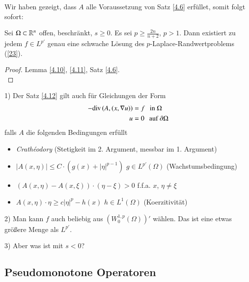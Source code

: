 Wir haben gezeigt, dass $A$ alle Voraussetzung von Satz \ref{4.6} erfüllet, somit folgt sofort:

\begin{theorem}\label{4.12}
    Sei $\Omega\subset\mathbb{R}^n$ offen, beschränkt, $s\geq 0$. Es sei $p\geq  \frac{2n}{n+2}$, $p>1$. Dann
    existiert zu jedem $f\in L^{p'}$ genau eine schwache Lösung des $p$-Laplace-Randwertproblems
    (\ref{23}).
\end{theorem}

\begin{proof}
    Lemma \ref{4.10}, \ref{4.11}, Satz \ref{4.6}.
    \[ \]
\end{proof}

\begin{remark}
    \begin{description}
        \item{1)}
        Der Satz \ref{4.12} gilt auch für Gleichungen der Form
        \begin{align*}
            -\mathrm{div}\,(A,(x,\nabla u))&=f \hspace{.25cm} \text{in } \Omega\\
                        u&=0 \hspace{.25cm} \text{auf }\partial\Omega
        \end{align*}
        falls $A$ die folgenden Bedingungen erfüllt
        \begin{itemize}
            \item \textit{Crathéodory} (Stetigkeit im 2. Argument, messbar im 1. Argument)
            \item  $|A(x,\eta)|\leq C\cdot (g(x)+ |\eta|^{p-1})$ $g\in L^{p'}(\Omega)$
                (Wachstumsbedingung)
            \item $(A(x,\eta)- A(x,\xi))\cdot (\eta-\xi)>0$ f.f.a. $x$, $\eta\neq \xi$
            \item $A(x,\eta)\cdot\eta\geq c|\eta|^p-h(x)$ $h\in L^1(\Omega)$ (Koerzitivität)
        \end{itemize}
        \item{2)}
        Man kann $f$ auch beliebig aus $(W_0^{1,p}(\Omega))'$ wählen. Das ist eine etwas größere Menge
        als $L^{p'}$.
        \item{3)} Aber was ist mit $s<0$?
    \end{description}
\end{remark}

\subsection{Pseudomonotone Operatoren}

